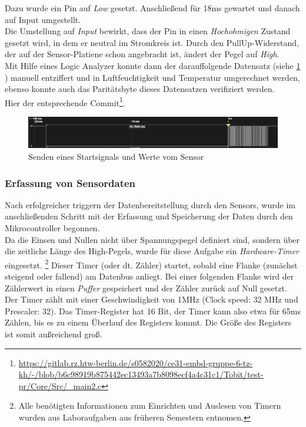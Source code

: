 \documentclass[11pt,a4paper,titlepage]{article}
\begin{document}
Dazu wurde ein Pin auf \textit{Low} gesetzt. Anschließend für 18ms gewartet und danach auf Input umgestellt.\\
Die Umstellung auf \textit{Input} bewirkt, dass der Pin in einen \textit{Hochohmigen} Zustand gesetzt wird, in dem er neutral im Stromkreis ist.
Durch den PullUp-Widerstand, der auf der Sensor-Platiene schon angebracht ist, ändert der Pegel auf \textit{High}.\\
Mit Hilfe eines Logic Analyzer konnte dann der darauffolgende Datensatz (siehe \cref{fig:startsignal} ) manuell entziffert
und in Luftfeuchtigkeit und Temperatur umgerechnet werden,
ebenso konnte auch das Paritätsbyte dieses Datensatzen verifiziert werden.\\

Hier der entsprechende Commit\footnote{\url{https://gitlab.rz.htw-berlin.de/s0582020/ce31-embd-gruppe-6-tz-kh/-/blob/b6c98919b875442ec13493a7b8098ecf4a4c31c1/Tobit/test-pr/Core/Src/_main2.c}}.\\

\begin{figure}[H]
    \centering
    \includegraphics[width=\textwidth]{./Bilder-Tobit/send_startsignal.PNG}
    \caption{Senden eines Startsignals und Werte vom Sensor}
    \label{fig:startsignal}
\end{figure}

\subsubsection{Erfassung von Sensordaten}
Nach erfolgreicher triggern der Datenbereitstellung durch den Sensors,
wurde im anschließenden Schritt mit der Erfassung und Speicherung der Daten durch den Mikrocontroller begonnen.\\

Da die Einsen und Nullen nicht über Spannungspegel definiert sind, sondern über die zeitliche Länge des High-Pegels,
wurde für diese Aufgabe ein \textit{Hardware-Timer} eingesetzt.
\footnote{Alle benötigten Informationen zum Einrichten und Auslesen von Timern wurden aus Laboraufgaben
    aus früheren Semestern entnomen.}
Dieser Timer (oder dt. Zähler) startet, sobald eine Flanke (zunächst steigend oder fallend) am Datenbus anliegt.
Bei einer folgenden Flanke wird der Zählerwert in einen \textit{Puffer} gespeichert und der Zähler zurück auf Null gesetzt.\\
Der Timer zählt mit einer Geschwindigkeit von 1MHz (Clock speed: 32 MHz und Prescaler: 32).
Das Timer-Register hat 16 Bit, der Timer kann also etwa für 65ms Zählen, bis es zu einem Überlauf des Registers kommt.
Die Größe des Registers ist somit außreichend groß.\\
\end{document}
